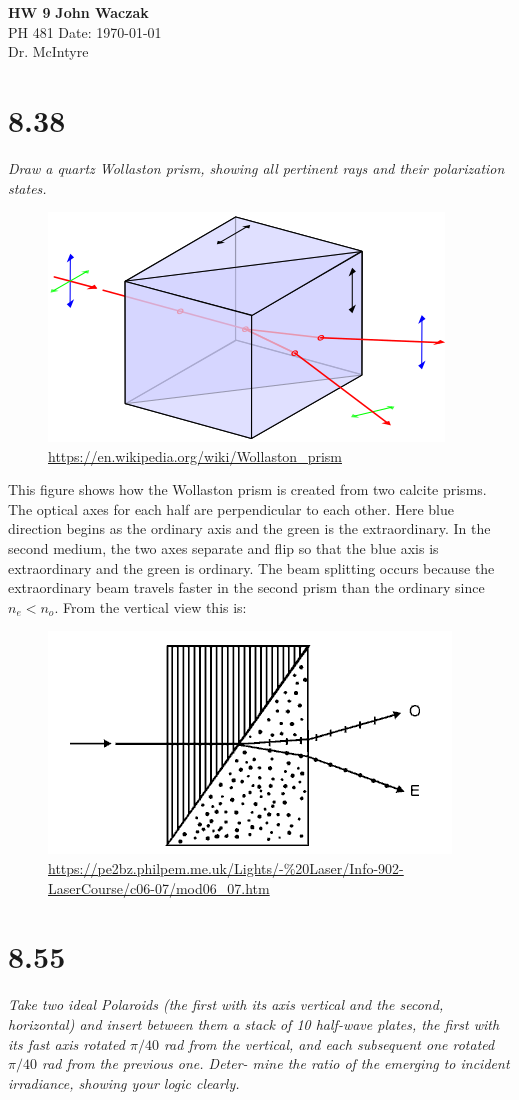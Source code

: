 \documentclass[a4paper, 11pt]{article}
\begin{document}
\noindent
\large\textbf{HW 9} \hfill \textbf{John Waczak} \\
\normalsize PH 481 \hfill  Date: \today \\
Dr. McIntyre \\

 
\section*{8.38}
\textit{Draw a quartz Wollaston prism, showing all pertinent rays and
	their polarization states.} \\ 

	\begin{figure}[!hbt]
		\centering
		\includegraphics*[width=0.5\columnwidth]{wollastonPrism}
		\caption{\url{https://en.wikipedia.org/wiki/Wollaston_prism}}
	\end{figure}
This figure shows how the Wollaston prism is created from two calcite prisms. The optical axes for each half  are perpendicular to each other. Here blue direction begins as the ordinary axis and the green is the extraordinary. In the second medium, the two axes separate and flip so that the blue axis is extraordinary and the green is ordinary. The beam splitting occurs because the extraordinary beam travels faster in the second prism than the ordinary since $n_e < n_o$. From the vertical view this is: 
	\begin{figure}[!hbt]
		\centering
		\includegraphics[width = 0.5\columnwidth]{wollastonTop}
		\caption{\url{https://pe2bz.philpem.me.uk/Lights/-\%20Laser/Info-902-LaserCourse/c06-07/mod06_07.htm}} 
	\end{figure}
	
\section*{8.55}
\textit{Take two ideal Polaroids (the first with its axis vertical and the
	second, horizontal) and insert between them a stack of 10 half-wave
	plates, the first with its fast axis rotated $\pi/40$ rad from the vertical, and
	each subsequent one rotated $\pi/40$ rad from the previous one. Deter-
	mine the ratio of the emerging to incident irradiance, showing your
	logic clearly.}\\
\end{document}
